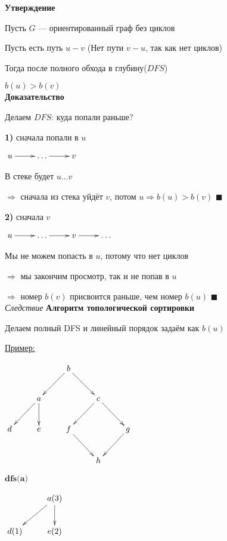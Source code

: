 \documentclass[a4paper, 12pt] {article}
\begin{document}
\newpage

\hypertarget{d7}{\textbf{Утверждение}} Пусть $ G $ --- ориентированный граф без циклов

Пусть есть путь $ u - v $ (Нет пути $ v - u $, так как нет циклов)

Тогда после полного обхода в глубину($ DFS $)

$ b(u) > b(v) $\\

\textbf{Доказательство}

Делаем $ DFS $: куда попали раньше?

\textbf{1)} сначала попали в $ u $

$ \begin{matrix}
	\xymatrix{
		u \ar@{->}[r] & \dots \ar@{->}[r] & v
	}
\end{matrix} $

В стеке будет $ u \dots v $

$ \Rightarrow $ сначала из стека уйдёт $ v $, потом $ u \Rightarrow b(u) > b(v)$ $ \blacksquare $ 

\textbf{2)} сначала $ v $

$ \begin{matrix}
	\xymatrix{
		u \ar@{->}[r] & \dots \ar@{->}[r] & v \ar@{->}[r] & \dots
	}
\end{matrix} $

Мы не можем попасть в $ u $, потому что нет циклов

$ \Rightarrow $ мы закончим просмотр, так и не попав в $ u $

$ \Rightarrow $ номер $ b(v) $ присвоится раньше, чем номер $ b(u) $ $ \blacksquare $\\

\textit{Следствие} \textbf{Алгоритм топологической сортировки}

Делаем полный DFS и линейный порядок задаём как $ b(u) $

\newpage

\underline{Пример:}

$ \begin{matrix}
	\xymatrix{
		& & b \ar@{->}[rd] \ar@{->}[ld]  \\
		& a \ar@{->}[d] \ar@{->}[ld] & & c \ar@{->}[rd] \ar@{->}[ld]  \\
		d & e & f \ar@{->}[rd]  & & g  \ar@{->}[ld] \\
		& & & h}
\end{matrix} $

$ \textbf{dfs(a)} $

$ \begin{matrix}
	\xymatrix{
		& a(3) \ar@{->}[d] \ar@{->}[ld] \\
		d(1) & e(2)
}\end{matrix} $\\
\end{document}
